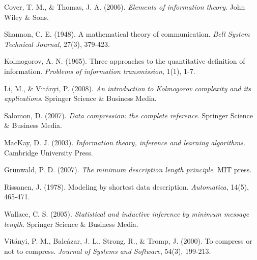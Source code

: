 \documentclass[12pt,a4paper]{article}
\begin{document}

\begin{thebibliography}{99}

Cover, T. M., \& Thomas, J. A. (2006). \textit{Elements of information theory}. John Wiley \& Sons.

Shannon, C. E. (1948). A mathematical theory of communication. \textit{Bell System Technical Journal}, 27(3), 379-423.

Kolmogorov, A. N. (1965). Three approaches to the quantitative definition of information. \textit{Problems of information transmission}, 1(1), 1-7.

Li, M., \& Vitányi, P. (2008). \textit{An introduction to Kolmogorov complexity and its applications}. Springer Science \& Business Media.

Salomon, D. (2007). \textit{Data compression: the complete reference}. Springer Science \& Business Media.

MacKay, D. J. (2003). \textit{Information theory, inference and learning algorithms}. Cambridge University Press.

Grünwald, P. D. (2007). \textit{The minimum description length principle}. MIT press.

Rissanen, J. (1978). Modeling by shortest data description. \textit{Automatica}, 14(5), 465-471.

Wallace, C. S. (2005). \textit{Statistical and inductive inference by minimum message length}. Springer Science \& Business Media.

Vitányi, P. M., Balcázar, J. L., Strong, R., \& Tromp, J. (2000). To compress or not to compress. \textit{Journal of Systems and Software}, 54(3), 199-213.

\end{thebibliography}
\end{document}
